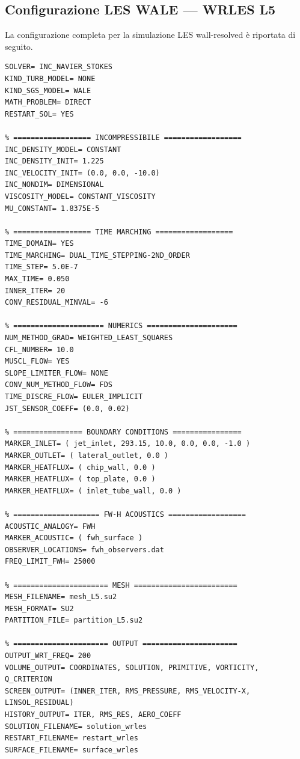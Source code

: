 \documentclass[11pt,a4paper]{article}
\begin{document}
\subsection{Configurazione LES WALE — WRLES L5}

La configurazione completa per la simulazione LES wall-resolved è riportata di seguito.

\begin{lstlisting}[style=SU2cfg, caption={Template SU2 completo per WRLES WALE su mesh L5 (12\,M celle). Impostare \texttt{RESTART\_SOL= YES} e fornire il file di restart dalla WMLES interpolata.}, label={lst:les}]
% ===================== SOLVER =====================
SOLVER= INC_NAVIER_STOKES
KIND_TURB_MODEL= NONE
KIND_SGS_MODEL= WALE
MATH_PROBLEM= DIRECT
RESTART_SOL= YES

% ================== INCOMPRESSIBILE ==================
INC_DENSITY_MODEL= CONSTANT
INC_DENSITY_INIT= 1.225
INC_VELOCITY_INIT= (0.0, 0.0, -10.0)
INC_NONDIM= DIMENSIONAL
VISCOSITY_MODEL= CONSTANT_VISCOSITY
MU_CONSTANT= 1.8375E-5

% ================== TIME MARCHING ==================
TIME_DOMAIN= YES
TIME_MARCHING= DUAL_TIME_STEPPING-2ND_ORDER
TIME_STEP= 5.0E-7
MAX_TIME= 0.050
INNER_ITER= 20
CONV_RESIDUAL_MINVAL= -6

% ===================== NUMERICS =====================
NUM_METHOD_GRAD= WEIGHTED_LEAST_SQUARES
CFL_NUMBER= 10.0
MUSCL_FLOW= YES
SLOPE_LIMITER_FLOW= NONE
CONV_NUM_METHOD_FLOW= FDS
TIME_DISCRE_FLOW= EULER_IMPLICIT
JST_SENSOR_COEFF= (0.0, 0.02)

% ================ BOUNDARY CONDITIONS ================
MARKER_INLET= ( jet_inlet, 293.15, 10.0, 0.0, 0.0, -1.0 )
MARKER_OUTLET= ( lateral_outlet, 0.0 )
MARKER_HEATFLUX= ( chip_wall, 0.0 )
MARKER_HEATFLUX= ( top_plate, 0.0 )
MARKER_HEATFLUX= ( inlet_tube_wall, 0.0 )

% ==================== FW-H ACOUSTICS ==================
ACOUSTIC_ANALOGY= FWH
MARKER_ACOUSTIC= ( fwh_surface )
OBSERVER_LOCATIONS= fwh_observers.dat
FREQ_LIMIT_FWH= 25000

% ====================== MESH ========================
MESH_FILENAME= mesh_L5.su2
MESH_FORMAT= SU2
PARTITION_FILE= partition_L5.su2

% ====================== OUTPUT ======================
OUTPUT_WRT_FREQ= 200
VOLUME_OUTPUT= COORDINATES, SOLUTION, PRIMITIVE, VORTICITY, Q_CRITERION
SCREEN_OUTPUT= (INNER_ITER, RMS_PRESSURE, RMS_VELOCITY-X, LINSOL_RESIDUAL)
HISTORY_OUTPUT= ITER, RMS_RES, AERO_COEFF
SOLUTION_FILENAME= solution_wrles
RESTART_FILENAME= restart_wrles
SURFACE_FILENAME= surface_wrles
\end{lstlisting}
\end{document}
